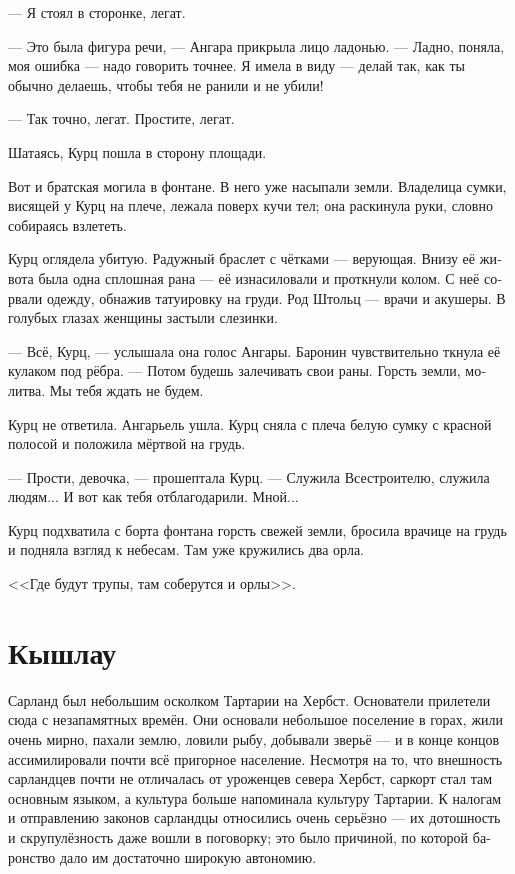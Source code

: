 \documentclass[a4paper,12pt,fleqn]{book}\usepackage{polyglossia}\setdefaultlanguage[babelshorthands=true]{russian}\setotherlanguage{english}\defaultfontfeatures{Ligatures=TeX,Mapping=tex-text}\usepackage{xcolor}\newcommand{\ml}[3]{#2}
\begin{document}
--- Я стоял в сторонке, легат.

--- Это была фигура речи, --- Ангара прикрыла лицо ладонью.
--- Ладно, поняла, моя ошибка --- надо говорить точнее.
Я имела в виду --- делай так, как ты обычно делаешь, чтобы тебя не ранили и не убили!

--- Так точно, легат.
Простите, легат.

Шатаясь, Курц пошла в сторону площади.

Вот и братская могила в фонтане.
В него уже насыпали земли.
Владелица сумки, висящей у Курц на плече, лежала поверх кучи тел;
она раскинула руки, словно собираясь взлететь.

Курц оглядела убитую.
Радужный браслет с чётками --- верующая.
Внизу её живота была одна сплошная рана --- её изнасиловали и проткнули колом.
С неё сорвали одежду, обнажив татуировку на груди.
Род Штольц --- врачи и акушеры.
В голубых глазах женщины застыли слезинки.

--- Всё, Курц, --- услышала она голос Ангары.
Баронин чувствительно ткнула её кулаком под рёбра.
--- Потом будешь залечивать свои раны.
Горсть земли, молитва.
Мы тебя ждать не будем.

Курц не ответила.
Ангарьель ушла.
Курц сняла с плеча белую сумку с красной полосой и положила мёртвой на грудь.

--- Прости, девочка, --- прошептала Курц.
--- Служила Всестроителю, служила людям...
И вот как тебя отблагодарили.
Мной...

Курц подхватила с борта фонтана горсть свежей земли, бросила врачице на грудь и подняла взгляд к небесам.
Там уже кружились два орла.

<<Где будут трупы, там соберутся и орлы>>.

\section{Кышлау}

Сарланд был небольшим осколком Тартарии на Хербст.
Основатели прилетели сюда с незапамятных времён.
Они основали небольшое поселение в горах, жили очень мирно, пахали землю, ловили рыбу, добывали зверьё --- и в конце концов ассимилировали почти всё пригорное население.
Несмотря на то, что внешность сарландцев почти не отличалась от уроженцев севера Хербст, саркорт стал там основным языком, а культура больше напоминала культуру Тартарии.
К налогам и отправлению законов сарландцы относились очень серьёзно --- их дотошность и скрупулёзность даже вошли в поговорку;
это было причиной, по которой баронство дало им достаточно широкую автономию.
\end{document}

